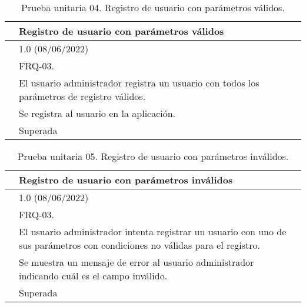 \begin{table}[H]
\begin{center}
\begin{tabular}{|p{3cm}|p{10cm}|} \hline
\centering {\bf PU-04} & Registro de usuario con parámetros válidos  \\ \hline\hline
\centering {\bf Versión} & 1.0 (08/06/2022) \\ \hline
\centering {\bf Dependencias} & FRQ-03. \\ \hline
\centering {\bf Descripción} &  El usuario administrador registra un usuario con todos los parámetros de registro válidos. \\ \hline
\centering {\bf Criterio de aceptación} & Se registra al usuario en la aplicación. \\ \hline
\centering {\bf Estado} & Superada \\ \hline
\end{tabular}
\caption{Prueba unitaria 04. Registro de usuario con parámetros válidos.}
\label{enlacePU4}
\end{center}
\end{table}

\begin{table}[H]
\begin{center}
\begin{tabular}{|p{3cm}|p{10cm}|} \hline
\centering {\bf PU-05} & Registro de usuario con parámetros inválidos  \\ \hline\hline
\centering {\bf Versión} & 1.0 (08/06/2022) \\ \hline
\centering {\bf Dependencias} & FRQ-03. \\ \hline
\centering {\bf Descripción} &  El usuario administrador intenta registrar un usuario con uno de sus parámetros con condiciones no válidas para el registro. \\ \hline
\centering {\bf Criterio de aceptación} & Se muestra un mensaje de error al usuario administrador indicando cuál es el campo inválido. \\ \hline
\centering {\bf Estado} & Superada \\ \hline
\end{tabular}
\caption{Prueba unitaria 05. Registro de usuario con parámetros inválidos.}
\label{enlacePU5}
\end{center}
\end{table}

